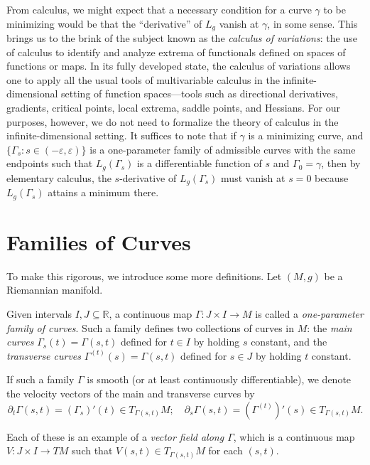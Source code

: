 From calculus, we might expect that a necessary condition for a curve $\gamma$ to be minimizing would be that the ``derivative'' of $L_g$ vanish at $\gamma$, in some sense. This brings us to the brink of the subject known as the \emph{calculus of variations}: the use of calculus to identify and analyze extrema of functionals defined on spaces of functions or maps. In its fully developed state, the calculus of variations allows one to apply all the usual tools of multivariable calculus in the infinite-dimensional setting of function spaces---tools such as directional derivatives, gradients, critical points, local extrema, saddle points, and Hessians. For our purposes, however, we do not need to formalize the theory of calculus in the infinite-dimensional setting. It suffices to note that if $\gamma$ is a minimizing curve, and $\{\Gamma_s : s \in (-\varepsilon,\varepsilon)\}$ is a one-parameter family of admissible curves with the same endpoints such that $L_g(\Gamma_s)$ is a differentiable function of $s$ and $\Gamma_0 = \gamma$, then by elementary calculus, the $s$-derivative of $L_g(\Gamma_s)$ must vanish at $s = 0$ because $L_g(\Gamma_s)$ attains a minimum there.

\section{Families of Curves}

To make this rigorous, we introduce some more definitions. Let $(M, g)$ be a Riemannian manifold.

\begin{definition}
\label{def:one-parameter-family-of-curves}

Given intervals $I, J \subseteq \mathbb{R}$, a continuous map $\Gamma: J \times I \to M$ is called a \emph{one-parameter family of curves}. Such a family defines two collections of curves in $M$: the \emph{main curves} $\Gamma_s(t) = \Gamma(s,t)$ defined for $t \in I$ by holding $s$ constant, and the \emph{transverse curves} $\Gamma^{(t)}(s) = \Gamma(s,t)$ defined for $s \in J$ by holding $t$ constant.

If such a family $\Gamma$ is smooth (or at least continuously differentiable), we denote the velocity vectors of the main and transverse curves by
\[
\partial_t \Gamma(s,t) = (\Gamma_s)'(t) \in T_{\Gamma(s,t)} M; \quad \partial_s \Gamma(s,t) = (\Gamma^{(t)})'(s) \in T_{\Gamma(s,t)} M.
\]

Each of these is an example of a \emph{vector field along $\Gamma$}, which is a continuous map $V: J \times I \to TM$ such that $V(s,t) \in T_{\Gamma(s,t)} M$ for each $(s,t)$.
\end{definition}

